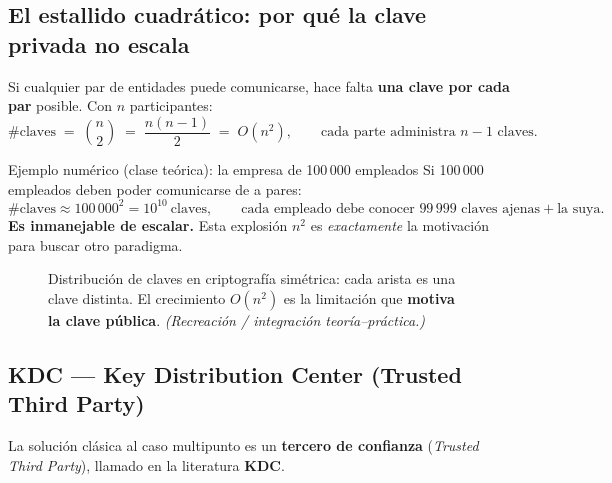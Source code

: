\documentclass[11pt,a4paper]{article}
\begin{document}
\subsection{El estallido cuadrático: por qué la clave privada no escala}
Si cualquier par de entidades puede comunicarse, hace falta \textbf{una clave por cada par}
posible. Con $n$ participantes:
\[
  \#\text{claves} \;=\; \binom{n}{2} \;=\; \frac{n(n-1)}{2} \;=\; O(n^2),
  \qquad
  \text{cada parte administra } n-1 \text{ claves.}
\]

\begin{practbox}{Ejemplo numérico (clase teórica): la empresa de 100\,000 empleados}
Si 100\,000 empleados deben poder comunicarse de a pares:
\[
  \#\text{claves}\approx 100\,000^2 = 10^{10}\ \text{claves},
  \qquad
  \text{cada empleado debe conocer } 99\,999 \text{ claves ajenas} + \text{la suya.}
\]
\textbf{Es inmanejable de escalar.} Esta explosión $n^2$ es \emph{exactamente} la motivación
para buscar otro paradigma.
\end{practbox}

\begin{figure}[h]
\centering
{}
\caption{Distribución de claves en criptografía simétrica: cada arista es una clave distinta.
El crecimiento $O(n^2)$ es la limitación que \textbf{motiva la clave pública}.
\textit{(Recreación / integración teoría--práctica.)}}
\end{figure}

\subsection{KDC — Key Distribution Center (Trusted Third Party)}
La solución clásica al caso multipunto es un \textbf{tercero de confianza}
(\emph{Trusted Third Party}), llamado en la literatura \textbf{KDC}.
\end{document}
